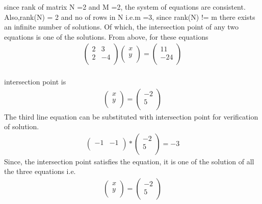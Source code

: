 \documentclass[journal,12pt,twocolumn]{IEEEtran}
\begin{document}
since rank of matrix N =2 and M =2, the system of equations are consistent.\\ 
Also,rank(N) = 2 and no of rows in N i.e.m =3, since rank(N) != m there exists an infinite number of solutions. Of which, the intersection point of any two equations is one of the solutions. From above, for these equations
\begin{align*}
\begin{pmatrix}2 & 3\\2 & -4\\\end{pmatrix}
\begin{pmatrix}x\\y\\\end{pmatrix}=
\begin{pmatrix}11\\-24\\\end{pmatrix}
\end{align*}
\\intersection point is 
\begin{align*}
\begin{pmatrix}x\\y\\\end{pmatrix}=\begin{pmatrix}-2\\5\\\end{pmatrix}
\end{align*}
The third line equation can be substituted with intersection point for verification of solution.
\begin{align*}
\begin{pmatrix}-1 & -1\\\end{pmatrix}*\begin{pmatrix}-2\\5\\\end{pmatrix}=-3
\end{align*}
Since, the intersection point satisfies the equation, it is one of the solution of all the three equations i.e.
\begin{align*}
\begin{pmatrix}x\\y\\\end{pmatrix}=\begin{pmatrix}-2\\5\\\end{pmatrix}
\end{align*}
\end{document}

